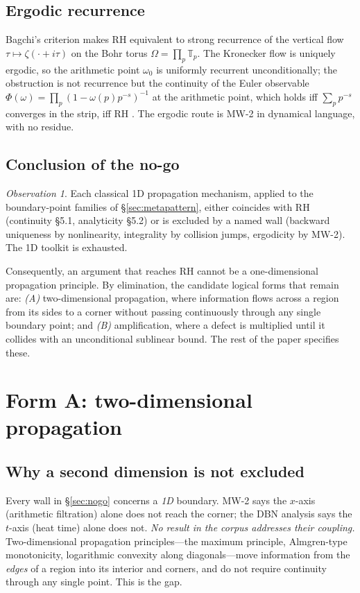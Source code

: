 \documentclass[11pt]{amsart}
\theoremstyle{definition}
\theoremstyle{remark}
\newtheorem{observation}[theorem]{Observation}
\begin{document}
\subsection{Ergodic recurrence}
Bagchi's criterion makes RH equivalent to strong recurrence of the
vertical flow $\tau\mapsto\zeta(\cdot+i\tau)$ on the Bohr torus
$\Omega=\prod_p\mathbb{T}_p$. The Kronecker flow is uniquely ergodic, so the
arithmetic point $\omega_0$ is uniformly recurrent unconditionally; the
obstruction is not recurrence but the continuity of the Euler observable
$\Phi(\omega)=\prod_p(1-\omega(p)p^{-s})^{-1}$ at the arithmetic point,
which holds iff $\sum_p p^{-s}$ converges in the strip, iff RH
\cite[Prop.~7.2]{P40}. The ergodic route is MW-2 in dynamical
language, with no residue.

\subsection{Conclusion of the no-go}
\begin{observation}\label{obs:nogo}
Each classical 1D propagation mechanism, applied to the boundary-point
families of \S\ref{sec:metapattern}, either coincides with RH
(continuity \S5.1, analyticity \S5.2) or is excluded by a named wall
(backward uniqueness by nonlinearity, integrality by collision jumps,
ergodicity by MW-2). The 1D toolkit is exhausted.
\end{observation}
Consequently, an argument that reaches RH cannot be a one-dimensional
propagation principle. By elimination, the candidate logical forms that
remain are: \emph{(A)} two-dimensional propagation, where information flows
across a region from its sides to a corner without passing continuously
through any single boundary point; and \emph{(B)} amplification, where a
defect is multiplied until it collides with an unconditional sublinear
bound. The rest of the paper specifies these.

\section{Form A: two-dimensional propagation}\label{sec:formA}

\subsection{Why a second dimension is not excluded}
Every wall in \S\ref{sec:nogo} concerns a \emph{1D} boundary. MW-2 says the
$x$-axis (arithmetic filtration) alone does not reach the corner; the DBN
analysis says the $t$-axis (heat time) alone does not. \emph{No result in
the corpus addresses their coupling.} Two-dimensional propagation
principles---the maximum principle, Almgren-type monotonicity, logarithmic
convexity along diagonals---move information from the \emph{edges} of a
region into its interior and corners, and do not require continuity through
any single point. This is the gap.
\end{document}
